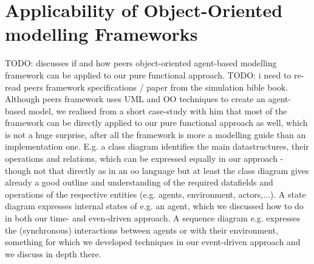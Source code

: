 \chapter{Applicability of Object-Oriented modelling Frameworks}
TODO: discusses if and how peers object-oriented agent-based modelling framework can be applied to our pure functional approach. TODO: i need to re-read peers framework specifications / paper from the simulation bible book.
Although peers framework uses UML and OO techniques to create an agent-based model, we realised from a short case-study with him that most of the framework can be directly applied to our pure functional approach as well, which is not a huge surprise, after all the framework is more a modelling guide than an implementation one. E.g. a class diagram identifies the main datastructures, their operations and relations, which can be expressed equally in our approach - though not that directly as in an oo language but at least the class diagram gives already a good outline and understanding of the required datafields and operations of the respective entities (e.g. agents, environment, actors,...). A state diagram expresses internal states of e.g. an agent, which we discussed how to do in both our time- and even-driven approach. A sequence diagram e.g. expresses the (synchronous) interactions between agents or with their environment, something for which we developed techniques in our event-driven approach and we discuss in depth there. 